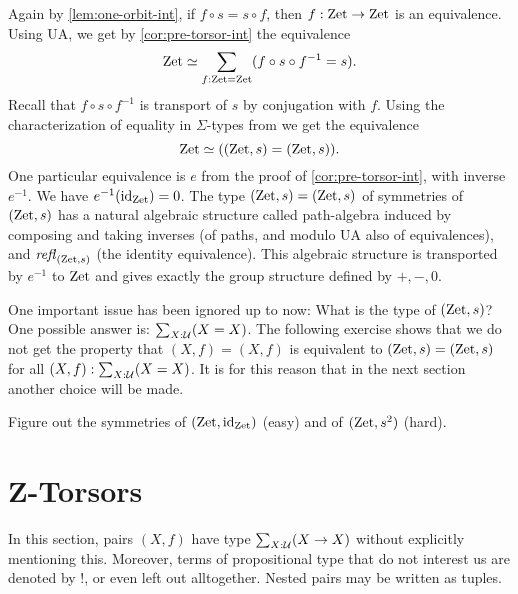 \documentclass[a4,12pt]{amsart}
\begin{document}
Again by \cref{lem:one-orbit-int}, if $f\circ s = s\circ f$,
then $f: \mathrm{Zet}\to\mathrm{Zet}$ is an equivalence. 
Using UA, we get by \cref{cor:pre-torsor-int} the equivalence
\[
\mathrm{Zet}\simeq \sum_{f:\mathrm{Zet}=\mathrm{Zet}} (f\circ s \circ f^{-1} = s).
\]
Recall that $f\circ s \circ f^{-1}$ is transport of $s$ by
conjugation with $f$. Using the characterization of equality 
in $\Sigma$-types from \cite[Theorem 2.7.2]{hottbook} we get the equivalence
\[
\mathrm{Zet}\simeq ((\mathrm{Zet},s) = (\mathrm{Zet},s)).
\]
One particular equivalence is $e$ from the proof
of \cref{cor:pre-torsor-int}, with inverse $e^{-1}$.
We have $e^{-1}(\mathord{\mathrm{id}}_{\mathrm{Zet}}) = 0$.
The type $(\mathrm{Zet},s) = (\mathrm{Zet},s)$ of symmetries of $(\mathrm{Zet},s)$
has a natural algebraic structure called path-algebra
induced by composing and taking inverses (of paths,
and modulo UA also of equivalences), and $\mathop{{\it refl}_{(\mathrm{Zet},s)}}$
(the identity equivalence).
This algebraic structure is transported by $e^{-1}$ to $\mathrm{Zet}$
and gives exactly the group structure defined by ${+},{-},0$.

One important issue has been ignored up to now:
What is the type of $(\mathrm{Zet},s)$? 
One possible answer is: $\sum_{X:\mathcal{U}}(X=X)$.
The following exercise shows that we do not get the 
property that $(X,f)=(X,f)$ is equivalent to
$(\mathrm{Zet},s) = (\mathrm{Zet},s)$ for all $(X,f) : \sum_{X:\mathcal{U}}(X=X)$.
It is for this reason that in the next section
another choice will be made.

\begin{xca}\label{xca:zet-symmetries}
Figure out the symmetries of $(\mathrm{Zet},\mathord{\mathrm{id}}_{\mathrm{Zet}})$ (easy) and 
of $(\mathrm{Zet},s^2)$ (hard).
\end{xca}

\section{Z-Torsors}\label{sec:ZTorsors}

In this section, pairs $(X,f)$ have type $\sum_{X:\mathcal{U}}(X\to X)$
without explicitly mentioning this. Moreover, terms of
propositional type that do not interest us are denoted by $!$,
or even left out alltogether. Nested pairs may be written as tuples.
\end{document}
